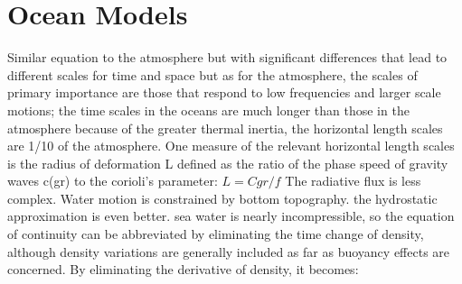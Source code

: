 \section{Ocean Models}


Similar equation to the atmosphere but with significant differences that lead to different scales for time and space
but as for the atmosphere, the scales of primary importance are those that respond to low frequencies and larger scale motions; the time scales in the oceans are much longer than those in the atmosphere because of the greater thermal inertia, the horizontal length scales are 1/10 of the atmosphere. One measure of the relevant horizontal length scales is the radius of deformation L defined as the ratio of the phase speed of gravity waves c(gr) to the corioli's parameter:  \(L=Cgr/f\)
The radiative flux is less complex.
Water motion is constrained by bottom topography.
the hydrostatic approximation is even better.
sea water is nearly incompressible, so the equation of continuity can be abbreviated by eliminating the time change of density, although density variations are generally included as far as buoyancy effects are concerned. By eliminating the derivative of density, it becomes:


